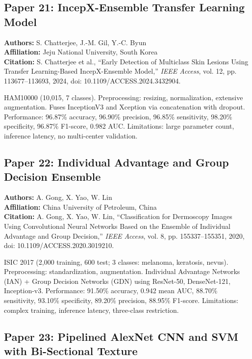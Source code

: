\documentclass[conference]{IEEEtran}
\begin{document}
\subsection{Paper 21: IncepX-Ensemble Transfer Learning Model}

\noindent\textbf{Authors:} S. Chatterjee, J.-M. Gil, Y.-C. Byun\\
\textbf{Affiliation:} Jeju National University, South Korea\\
\textbf{Citation:} S. Chatterjee et al., ``Early Detection of Multiclass Skin Lesions Using Transfer Learning-Based IncepX-Ensemble Model,'' \textit{IEEE Access}, vol. 12, pp. 113677--113693, 2024, doi: 10.1109/ACCESS.2024.3432904.

HAM10000 (10,015, 7 classes). Preprocessing: resizing, normalization, extensive augmentation. Fuses InceptionV3 and Xception via concatenation with dropout. Performance: 96.87\% accuracy, 96.90\% precision, 96.85\% sensitivity, 98.20\% specificity, 96.87\% F1-score, 0.982 AUC. Limitations: large parameter count, inference latency, no multi-center validation.

\subsection{Paper 22: Individual Advantage and Group Decision Ensemble}

\noindent\textbf{Authors:} A. Gong, X. Yao, W. Lin\\
\textbf{Affiliation:} China University of Petroleum, China\\
\textbf{Citation:} A. Gong, X. Yao, W. Lin, ``Classification for Dermoscopy Images Using Convolutional Neural Networks Based on the Ensemble of Individual Advantage and Group Decision,'' \textit{IEEE Access}, vol. 8, pp. 155337--155351, 2020, doi: 10.1109/ACCESS.2020.3019210.

ISIC 2017 (2,000 training, 600 test; 3 classes: melanoma, keratosis, nevus). Preprocessing: standardization, augmentation. Individual Advantage Networks (IAN) + Group Decision Networks (GDN) using ResNet-50, DenseNet-121, Inception-v3. Performance: 91.50\% accuracy, 0.942 mean AUC, 88.70\% sensitivity, 93.10\% specificity, 89.20\% precision, 88.95\% F1-score. Limitations: complex training, inference latency, three-class restriction.

\subsection{Paper 23: Pipelined AlexNet CNN and SVM with Bi-Sectional Texture}
\end{document}
